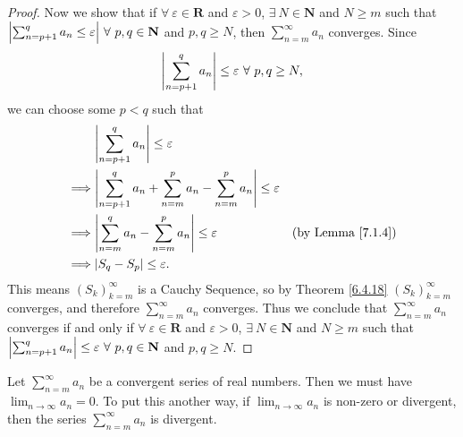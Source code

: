 \begin{proof}
    Now we show that if \(\forall\ \varepsilon \in \mathbf{R}\) and \(\varepsilon > 0\), \(\exists\ N \in \mathbf{N}\) and \(N \geq m\) such that \(\abs*{\sum_{n = p + 1}^q a_n \leq \varepsilon} \ \forall\ p, q \in \mathbf{N}\) and \(p, q \geq N\), then \(\sum_{n = m}^\infty a_n\) converges.
    Since
    \[
        \abs*{\sum_{n = p + 1}^q a_n} \leq \varepsilon \ \forall\ p, q \geq N,
    \]
    we can choose some \(p < q\) such that
    \begin{align*}
                 & \abs*{\sum_{n = p + 1}^q a_n} \leq \varepsilon                                                                           \\
        \implies & \abs*{\sum_{n = p + 1}^q a_n + \sum_{n = m}^p a_n - \sum_{n = m}^p a_n} \leq \varepsilon                                 \\
        \implies & \abs*{\sum_{n = m}^q a_n - \sum_{n = m}^p a_n} \leq \varepsilon                          & \text{(by Lemma \ref{7.1.4})} \\
        \implies & \abs*{S_q - S_p} \leq \varepsilon.
    \end{align*}
    This means \((S_k)_{k = m}^\infty\) is a Cauchy Sequence, so by Theorem \ref{6.4.18} \((S_k)_{k = m}^\infty\) converges, and therefore \(\sum_{n = m}^\infty a_n\) converges.
    Thus we conclude that \(\sum_{n = m}^\infty a_n\) converges if and only if \(\forall\ \varepsilon \in \mathbf{R}\) and \(\varepsilon > 0\), \(\exists\ N \in \mathbf{N}\) and \(N \geq m\) such that \(\abs*{\sum_{n = p + 1}^q a_n} \leq \varepsilon \ \forall\ p, q \in \mathbf{N}\) and \(p, q \geq N\).
\end{proof}

\begin{corollary}\label{7.2.6}
    Let \(\sum_{n = m}^\infty a_n\) be a convergent series of real numbers.
    Then we must have \(\lim_{n \to \infty} a_n = 0\).
    To put this another way, if \(\lim_{n \to \infty} a_n\) is non-zero or divergent, then the series \(\sum_{n = m}^\infty a_n\) is divergent.
\end{corollary}

